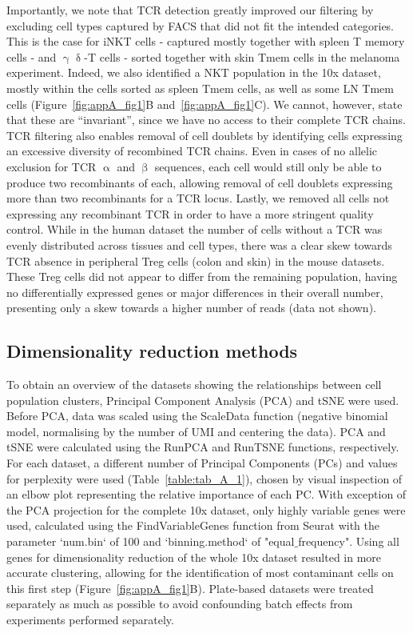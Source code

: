 Importantly, we note that TCR detection greatly improved our filtering by excluding cell types captured by FACS that did not fit the intended categories. This is the case for iNKT cells - captured mostly together with spleen T memory cells - and ${\upgamma\updelta}$-T cells - sorted together with skin Tmem cells in the melanoma experiment. Indeed, we also identified a NKT population in the 10x dataset, mostly within the cells sorted as spleen Tmem cells, as well as some LN Tmem cells (Figure~\ref{fig:appA_fig1}B and~\ref{fig:appA_fig1}C). We cannot, however, state that these are “invariant”, since we have no access to their complete TCR chains. TCR filtering also enables removal of cell doublets by identifying cells expressing an excessive diversity of recombined TCR chains. Even in cases of no allelic exclusion for TCR ${\upalpha}$ and ${\upbeta}$ sequences, each cell would still only be able to produce two recombinants of each, allowing removal of cell doublets expressing more than two recombinants for a TCR locus. Lastly, we removed all cells not expressing any recombinant TCR in order to have a more stringent quality control. While in the human dataset the number of cells without a TCR was evenly distributed across tissues and cell types, there was a clear skew towards TCR absence in peripheral Treg cells (colon and skin) in the mouse datasets. These Treg cells did not appear to differ from the remaining population, having no differentially expressed genes or major differences in their overall number, presenting only a skew towards a higher number of reads (data not shown).

\subsection{Dimensionality reduction methods}
To obtain an overview of the datasets showing the relationships between cell population clusters, Principal Component Analysis (PCA) and tSNE were used. Before PCA, data was scaled using the ScaleData function (negative binomial model, normalising by the number of UMI and centering the data). PCA and tSNE were calculated using the RunPCA and RunTSNE functions, respectively. For each dataset, a different number of Principal Components (PCs) and values for perplexity were used (Table~\ref{table:tab_A_1}), chosen by visual inspection of an elbow plot representing the relative importance of each PC. With exception of the PCA projection for the complete 10x dataset, only highly variable genes were used, calculated using the FindVariableGenes function from Seurat with the parameter `num.bin` of 100 and `binning.method` of "equal${\_}$frequency". Using all genes for dimensionality reduction of the whole 10x dataset resulted in more accurate clustering, allowing for the identification of most contaminant cells on this first step (Figure~\ref{fig:appA_fig1}B). Plate-based datasets were treated separately as much as possible to avoid confounding batch effects from experiments performed separately.


